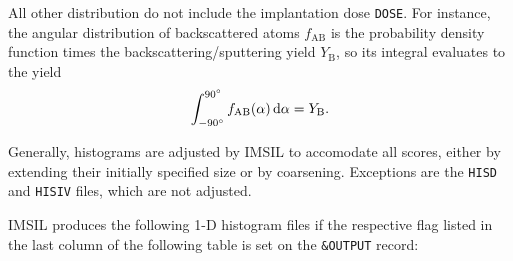 All other distribution do not include the implantation dose \texttt{DOSE}. For
instance, the angular distribution of backscattered atoms $f_\mathrm{AB}$ is the
probability density function times the backscattering/sputtering yield
$Y_\mathrm{B}$, so its integral evaluates to the yield
%
\begin{equation}
    \int_{-90\degree}^{90\degree} f_\mathrm{AB}(\alpha)\,\mathrm{d}\alpha
    = Y_\mathrm{B} .
    \label{eq:distr1d}
\end{equation}

Generally, histograms are adjusted by IMSIL to accomodate all scores, either by
extending their initially specified size or by coarsening. Exceptions are the
\texttt{HISD} and \texttt{HISIV} files, which are not adjusted.

IMSIL produces the following 1-D histogram files if the respective flag listed
in the last column of the following table is set on the \texttt{\&OUTPUT} record:
\bigskip
%
